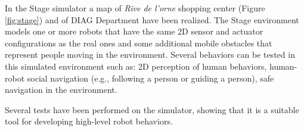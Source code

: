 In the Stage simulator a map of \emph{Rive de l'orne} shopping center (Figure \ref{fig:stage}) and of  DIAG Department have been realized.
The Stage environment models one or more robots that have the same 2D sensor and actuator configurations as the real ones and some additional mobile obstacles that represent people moving in the environment. Several behaviors can be tested in this simulated environment such as: 2D perception of human behaviors, human-robot social navigation (e.g., following a person or guiding a person), safe navigation in the environment.

Several tests have been performed on the simulator, showing that it is a suitable tool for developing high-level robot behaviors. 


%
%
%

